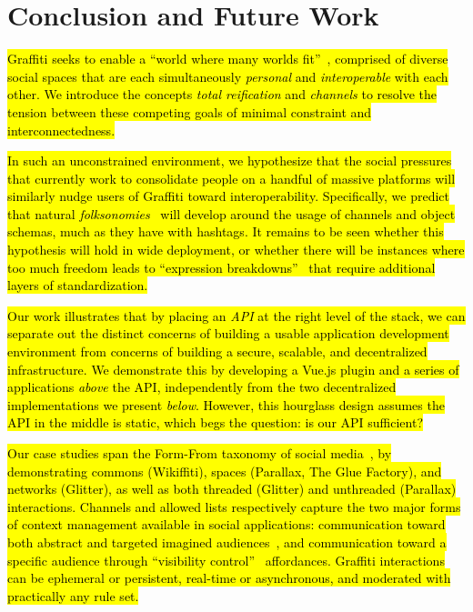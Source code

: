 \section{Conclusion and Future Work}

{\hl{%
Graffiti seeks to enable a ``world where many worlds fit''~{\cite{escobarpluriverse}},
comprised of diverse social spaces that are each simultaneously \emph{personal}
and \emph{interoperable} with each other.
We introduce the concepts \emph{total reification} and \emph{channels}
to resolve the tension between these competing goals
of minimal constraint and interconnectedness.
}}%

{\hl{%
In such an unconstrained environment,
we hypothesize that the social pressures that currently work
to consolidate people on a handful of massive platforms
will similarly nudge users of Graffiti toward interoperability.
Specifically, we predict that natural \emph{folksonomies}~{\cite{folksonomy}} will
develop around the usage of channels and object schemas, much as they have with hashtags.
It remains to be seen whether this hypothesis will hold in wide deployment,
or whether there will be instances where too much freedom leads to
``expression breakdowns''~{\cite{expressionbreakdowns}}
that require additional layers of standardization.
}}%

{\hl{%
Our work illustrates that by placing an \emph{API}
at the right level of the stack, we can separate out the distinct concerns
of building a usable application development environment
from concerns of building a secure, scalable, and decentralized infrastructure.
We demonstrate this by developing a Vue.js plugin and a series
of applications \emph{above} the API, independently from the
two decentralized implementations we present \emph{below}.
However, this hourglass design assumes the API in the middle is static,
which begs the question: is our API sufficient?
}}%

{\hl{%
Our case studies span the Form-From taxonomy of social media~{\cite{formfrom}},
by demonstrating commons (Wikiffiti), spaces (Parallax, The Glue Factory), and networks (Glitter),
as well as both threaded (Glitter) and unthreaded (Parallax) interactions.
Channels and allowed lists respectively capture the two major
forms of context management available in social applications:
communication toward both abstract and targeted imagined audiences~{\cite{imaginedaudience}},
and communication toward a specific audience through ``visibility control''~{\cite{visibilitycontrol}} affordances.
Graffiti interactions can be ephemeral or persistent, real-time or asynchronous,
and moderated with practically any rule set.
}}%

